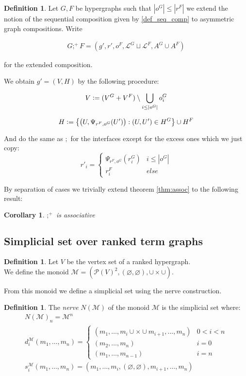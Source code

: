 \documentclass[12pt]{article}
\newtheorem{corollary}[theorem]{Corollary}
\theoremstyle{definition}
\newtheorem{definition}[theorem]{Definition}
\newcommand{\defeq}{\vcentcolon=}
\renewcommand{\P}{\mathcal{P}}
\newcommand{\1}{\mathbbm{1}}
\renewcommand{\L}{\mathcal{L}}
\newcommand{\M}{\mathcal{M}}
\newcommand{\seq}{;}
\begin{document}
\begin{definition}
    Let $G,F$ be hypergraphs such that $|o^G| \leq |r^F|$ we extend the notion of the sequential composition given by \ref{def_seq_comp} to asymmetric graph compositions. Write 

    \begin{align*}
        G\seq^+ F = (g', r', o^F, \L^G\sqcup \L^F, A^G\cup A^F)
    \end{align*}

    for the extended composition.

    We obtain $g' = (V,H)$ by the following procedure:

    \[
        V \defeq (V^G + V^F) \setminus \bigcup_{i\leq |o^G|}o^G_i    
    \]
    
    \[
        H \defeq \left\{ \left(U, \Psi_{r^F, o^G}(U')\right) : (U, U') \in H^G \right\} \cup H^F
    \]

    And do the same as $\seq$ for the interfaces except for the excess ones which we just copy:
    \[
        r'_i = 
        \begin{cases}
            \Psi_{r^F, o^G}(r^G_i) & i\leq |o^G|\\
            r^F_i & else
        \end{cases}
    \]
\end{definition}

By separation of cases we trivially extend theorem \ref{thm:assoc} to the following result:
\begin{corollary}
    $\seq^+$ is associative
\end{corollary}

\subsection{Simplicial set over ranked term graphs}
\begin{definition}
    Let $V$ be the vertex set of a ranked hypergraph.\\
    We define the monoid $\M = (\P(V)^2, (\varnothing, \varnothing), \cup\times\cup)$. 
\end{definition}

From this monoid we define a simplicial set using the nerve construction.

\begin{definition}
    The \emph{nerve} $N(\M)$ of the monoid $\M$ is the simplicial set where:
    \begin{align*}
        N(\M)_n = \M^n\\
        d^{\M}_i(m_1,\dots,m_n) = 
        \begin{cases}
            (m_1,\dots,m_i \cup\times\cup m_{i+1}, \dots, m_n) & 0 < i < n\\
            (m_2,\dots, m_n) & i = 0\\
            (m_1,\dots,m_{n-1}) & i = n
        \end{cases}\\
        s^{\M}_i(m_1,\dots,m_n) = (m_1, \dots, m_i, (\varnothing, \varnothing), m_{i+1}, \dots, m_n)\\
    \end{align*}
\end{definition}
\end{document}
